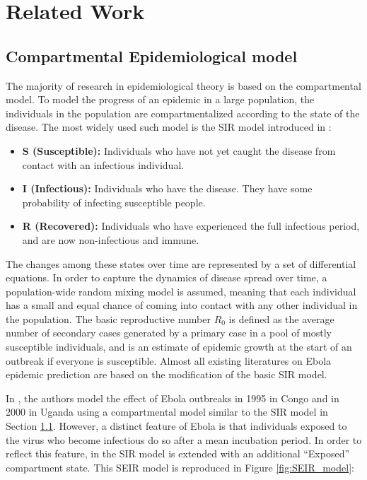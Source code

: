 \documentclass[10pt, journal,onecolumn]{IEEEtran}
\begin{document}

\section{{Related Work}}
\label{sec:RelatedWork}

\subsection{Compartmental Epidemiological model}
\label{SubSec:SIR}

The majority of research in epidemiological theory is based on the compartmental model. To model the progress of an epidemic in a large population, the individuals in the population are compartmentalized according to the state of the disease. The most widely used such model is the SIR model introduced in \citep{very_old_paper}:

\begin{itemize}
\item \textbf{S (Susceptible):} Individuals who have not yet caught the disease from contact with an infectious
  individual.
\item \textbf{I (Infectious):} Individuals who have the disease. They have some probability of
  infecting susceptible people.
\item \textbf{R (Recovered):} Individuals who have experienced the full infectious period, and are
  now non-infectious and immune.
\end{itemize}

The changes among these states over time are represented by a set of differential equations. In
order to capture the dynamics of disease spread over time, a population-wide random mixing model is
assumed, meaning that each individual has a small and equal chance of coming into contact with
any other individual in the population. The basic reproductive number $R_0$
is defined as the average number of secondary cases generated by a primary case in a pool of mostly
susceptible individuals, and is an estimate of epidemic growth at the start of an outbreak if
everyone is susceptible. Almost all existing literatures \citep{chowell2004basic,legrand2007understanding,gomes2014assessing} on Ebola epidemic prediction are based on the modification of the basic SIR model.

In \citep{chowell2004basic}, the authors model the effect of Ebola outbreaks in 1995 in Congo and in
2000 in Uganda using a compartmental model similar to the SIR model in Section \ref{SubSec:SIR}. However, a
distinct feature of Ebola is that individuals exposed to the virus who become infectious do so
after a mean incubation period. In order to reflect this feature, in the SIR model is extended with
an additional ``Exposed'' compartment state. This SEIR model is reproduced in
Figure \ref{fig:SEIR_model}:
\end{document}
